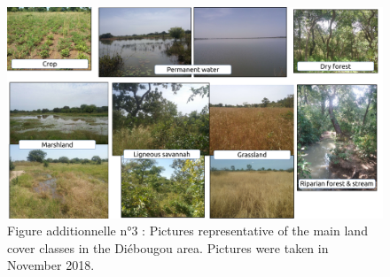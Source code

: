 \documentclass[12pt,twoside]{reedthesis}
\begin{document}
\begin{figure}

{\centering \includegraphics[width=1\linewidth]{figure/add_file_3} 

}

\caption[Article n°1 - Figure additionnelle n°3]{Figure additionnelle n°3 : Pictures representative of the main land cover classes in the Diébougou area. Pictures were taken in November 2018.}\label{fig:add-file-3}
\end{figure}
\end{document}
